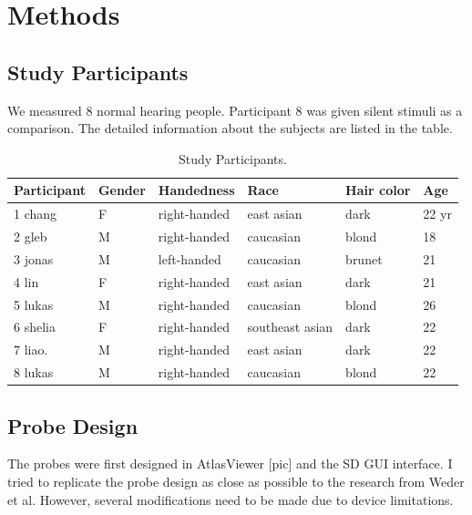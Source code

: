 \chapter{Methods}
\section {Study Participants}
We measured 8 normal hearing people. Participant 8 was given silent stimuli as a comparison. The detailed information about the subjects are listed in the table.

\begin{table}[h!]
  \begin{center}
    
    
    \begin{tabular}{p{2.3cm} | p{1.5cm} |p{3cm} | p{3cm} | p{2.5cm} | p{1cm}} %
      \textbf{Participant} & \textbf {Gender}& \textbf{Handedness} & \textbf{Race} & \textbf{Hair color} &\textbf {Age}\\ 
      \hline
      1 chang  & F & right-handed & east asian & dark & 22 yr \\
      2 gleb    & M & right-handed  & caucasian & blond & 18 \\
      3 jonas  & M & left-handed &  caucasian & brunet & 21\\
      4 lin      & F  & right-handed & east asian & dark& 21 \\
      5 lukas & M & right-handed  &  caucasian& blond & 26 \\
      6 shelia&  F & right-handed & southeast asian & dark & 22 \\
      7 liao.   &  M & right-handed &  east asian & dark & 22 \\
      8 lukas & M & right-handed  & caucasian & blond & 22 \\
    \end{tabular}
    \label{tab:table1}
    \caption{Study Participants.}
  \end{center}
  
\end{table}

\section {Probe Design}
The probes were first designed in AtlasViewer [pic] \cite {10.1117/1.NPh.2.2.020801} and the SD GUI interface. I tried to replicate the probe design as close as possible to the research from Weder et al. However, several modifications need to be made due to device limitations.

